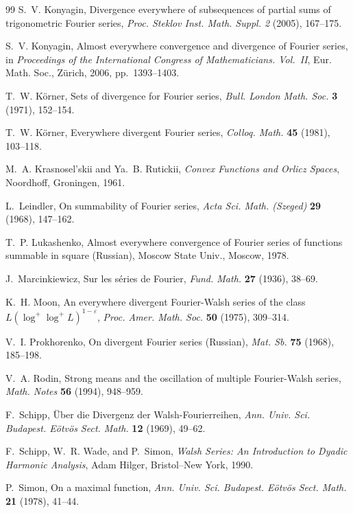 \documentclass[11pt]{amsart}
\numberwithin{equation}{section}
\theoremstyle{plain}
\begin{document}
\begin{thebibliography}{99}
 S.~V. Konyagin, Divergence everywhere of
subsequences of partial sums of trigonometric Fourier series, \emph{Proc.
Steklov Inst. Math. Suppl. 2} (2005), 167--175.

 S.~V. Konyagin, Almost everywhere convergence and
divergence of Fourier series, in \emph{Proceedings of the International
Congress of Mathematicians. Vol.~II}, Eur. Math. Soc., Z\"urich, 2006,
pp.~1393--1403.

 T.~W. K\"orner, Sets of divergence for Fourier series, 
\emph{Bull. London Math. Soc.} \textbf{3} (1971), 152--154.

 T.~W. K\"orner, Everywhere divergent Fourier
series, \emph{Colloq. Math.} \textbf{45} (1981), 103--118.

 M.~A. Krasnosel'skii and Ya.~B. Rutickii, 
\emph{Convex Functions and Orlicz Spaces}, Noordhoff, Groningen, 1961.

 L.~Leindler, On summability of Fourier series, \emph{Acta
Sci. Math. (Szeged)} \textbf{29} (1968), 147--162.

 T.~P. Lukashenko, Almost everywhere convergence of
Fourier series of functions summable in square (Russian), Moscow State
Univ., Moscow, 1978.

 J.~Marcinkiewicz, Sur les s\'eries de Fourier, \emph{%
Fund. Math.} \textbf{27} (1936), 38--69.

 K.~H. Moon, An everywhere divergent Fourier-Walsh series of
the class $L(\log^{+}\log^{+}L)^{1-\varepsilon}$, \emph{Proc. Amer. Math.
Soc.} \textbf{50} (1975), 309--314.

 V.~I. Prokhorenko, On divergent Fourier series
(Russian), \emph{Mat. Sb.} \textbf{75} (1968), 185--198.

 V.~A. Rodin, Strong means and the oscillation of multiple
Fourier-Walsh series, \emph{Math. Notes} \textbf{56} (1994), 948--959.

 F.~Schipp, \"Uber die Divergenz der
Walsh-Fourierreihen, \emph{Ann. Univ. Sci. Budapest. E\"otv\"os Sect. Math.} 
\textbf{12} (1969), 49--62.

 F.~Schipp, W.~R. Wade, and P.~Simon, \emph{Walsh
Series: An Introduction to Dyadic Harmonic Analysis}, Adam Hilger,
Bristol--New York, 1990.

 P.~Simon, On a maximal function, \emph{Ann. Univ. Sci.
Budapest. E\"otv\"os Sect. Math.} \textbf{21} (1978), 41--44.


\end{thebibliography}
\end{document}
